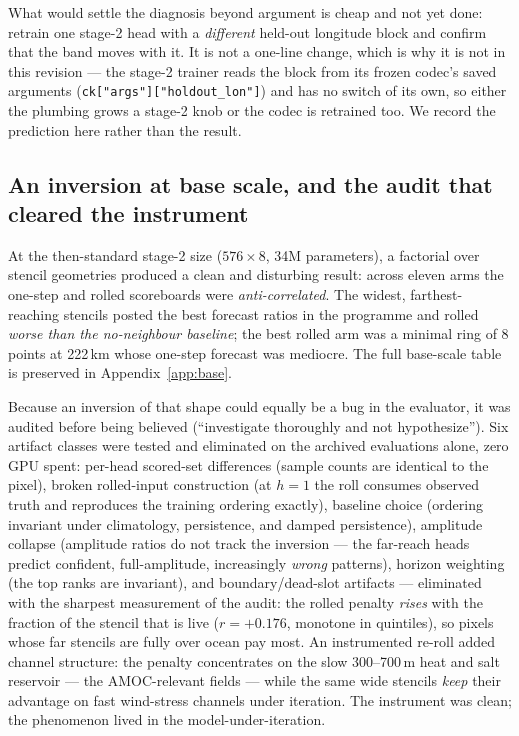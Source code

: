 \documentclass[10pt]{article}
\begin{document}
What would settle the diagnosis beyond argument is cheap and not yet
done: retrain one stage-2 head with a \emph{different} held-out
longitude block and confirm that the band moves with it. It is not a
one-line change, which is why it is not in this revision --- the
stage-2 trainer reads the block from its frozen codec's saved arguments
(\texttt{ck["args"]["holdout\_lon"]}) and has no switch of its own, so
either the plumbing grows a stage-2 knob or the codec is retrained too.
We record the prediction here rather than the result.


\subsection{An inversion at base scale, and the audit that cleared the
instrument}\label{sec:inversion}

At the then-standard stage-2 size ($576\times8$, 34M parameters), a
factorial over stencil geometries produced a clean and disturbing
result: across eleven arms the one-step and rolled scoreboards were
\emph{anti-correlated}. The widest, farthest-reaching stencils posted
the best forecast ratios in the programme and rolled \emph{worse than
the no-neighbour baseline}; the best rolled arm was a minimal ring of 8
points at 222\,km whose one-step forecast was mediocre. The full
base-scale table is preserved in Appendix~\ref{app:base}.

Because an inversion of that shape could equally be a bug in the
evaluator, it was audited before being believed
(``investigate thoroughly and not hypothesize''). Six artifact classes
were tested and eliminated on the archived evaluations alone, zero GPU
spent: per-head scored-set differences (sample counts are identical to
the pixel), broken rolled-input construction (at $h{=}1$ the roll
consumes observed truth and reproduces the training ordering exactly),
baseline choice (ordering invariant under climatology, persistence, and
damped persistence), amplitude collapse (amplitude ratios do not track
the inversion --- the far-reach heads predict confident, full-amplitude,
increasingly \emph{wrong} patterns), horizon weighting (the top ranks
are invariant), and boundary/dead-slot artifacts --- eliminated with the
sharpest measurement of the audit: the rolled penalty \emph{rises} with
the fraction of the stencil that is live ($r=+0.176$, monotone in
quintiles), so pixels whose far stencils are fully over ocean pay most.
An instrumented re-roll added channel structure: the penalty
concentrates on the slow 300--700\,m heat and salt reservoir --- the
AMOC-relevant fields --- while the same wide stencils \emph{keep} their
advantage on fast wind-stress channels under iteration. The instrument
was clean; the phenomenon lived in the model-under-iteration.
\end{document}
